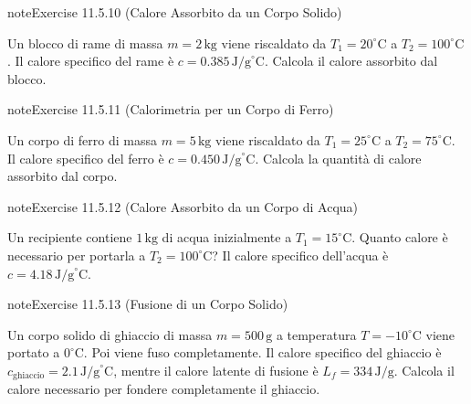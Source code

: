 \documentclass[letterpaper,10pt,italian]{jupyterBook}
\begin{document}
\begin{sphinxadmonition}{note}{Exercise 11.5.10 (Calore Assorbito da un Corpo Solido)}



\sphinxAtStartPar
Un blocco di rame di massa \(m = 2 \, \text{kg}\) viene riscaldato da \(T_1 = 20^\circ \text{C}\) a \(T_2 = 100^\circ \text{C}\). Il calore specifico del rame è \(c = 0.385 \, \text{J/g}^\circ \text{C}\). Calcola il calore assorbito dal blocco.
\end{sphinxadmonition}
 \label{exercise:ch/thermodynamics/foundation-problems-exercise-10}

\begin{sphinxadmonition}{note}{Exercise 11.5.11 (Calorimetria per un Corpo di Ferro)}



\sphinxAtStartPar
Un corpo di ferro di massa \(m = 5 \, \text{kg}\) viene riscaldato da \(T_1 = 25^\circ \text{C}\) a \(T_2 = 75^\circ \text{C}\). Il calore specifico del ferro è \(c = 0.450 \, \text{J/g}^\circ \text{C}\). Calcola la quantità di calore assorbito dal corpo.
\end{sphinxadmonition}
 \label{exercise:ch/thermodynamics/foundation-problems-exercise-11}

\begin{sphinxadmonition}{note}{Exercise 11.5.12 (Calore Assorbito da un Corpo di Acqua)}



\sphinxAtStartPar
Un recipiente contiene \(1 \, \text{kg}\) di acqua inizialmente a \(T_1 = 15^\circ \text{C}\). Quanto calore è necessario per portarla a \(T_2 = 100^\circ \text{C}\)? Il calore specifico dell’acqua è \(c = 4.18 \, \text{J/g}^\circ \text{C}\).
\end{sphinxadmonition}
 \label{exercise:ch/thermodynamics/foundation-problems-exercise-12}

\begin{sphinxadmonition}{note}{Exercise 11.5.13 (Fusione di un Corpo Solido)}



\sphinxAtStartPar
Un corpo solido di ghiaccio di massa \(m = 500 \, \text{g}\) a temperatura \(T = -10^\circ \text{C}\) viene portato a \(0^\circ \text{C}\). Poi viene fuso completamente. Il calore specifico del ghiaccio è \(c_{\text{ghiaccio}} = 2.1 \, \text{J/g}^\circ \text{C}\), mentre il calore latente di fusione è \(L_f = 334 \, \text{J/g}\). Calcola il calore necessario per fondere completamente il ghiaccio.
\end{sphinxadmonition}
 \label{exercise:ch/thermodynamics/foundation-problems-exercise-13}
\end{document}
